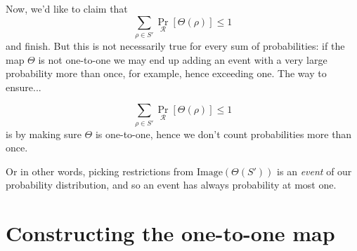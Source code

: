 Now, we'd like to claim that 
\[
\sum_{\rho \in S'} \Pr_{\mathcal{R}}[\Theta(\rho)] \leq 1
\]
and finish. But this is not necessarily true for every sum of probabilities: if the map \( \Theta \) is 
not one-to-one we may end up adding an event with a very large probability more than once, for example, 
hence exceeding one. The way to ensure...

\[
\sum_{\rho \in S'} \Pr_{\mathcal{R}}[\Theta(\rho)] \leq 1
\]
is by making sure \( \Theta \) is one-to-one, 
hence we don't count probabilities more than once.

Or in other words, picking restrictions from \(\text{Image}(\Theta(S'))\) 
is an \emph{event} of our probability distribution, 
and so an event has always probability at most one.

\section*{Constructing the one-to-one map}


